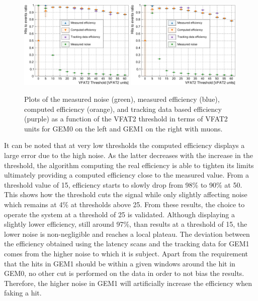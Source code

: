       \begin{figure}[h!]
        \centering
        \includegraphics[width=0.49\textwidth]{img/plots/cEfficiency_Threshold_GEM0-crop}
        \includegraphics[width=0.49\textwidth]{img/plots/cEfficiency_Threshold_GEM1-crop}
        \caption{Plots of the measured noise (green), measured efficiency (blue), computed efficiency (orange), and tracking data based efficiency (purple) as a function of the VFAT2 threshold in terms of VFAT2 units for GEM0 on the left and GEM1 on the right with muons.}
        \label{fig:II-3-data-eff-threshold}
      \end{figure}

      It can be noted that at very low thresholds the computed efficiency displays a large error due to the high noise. As the latter decreases with the increase in the threshold, the algorithm computing the real efficiency is able to tighten its limits ultimately providing a computed efficiency close to the measured value. From a threshold value of 15, efficiency starts to slowly drop from 98\% to 90\% at 50. This shows how the threshold cuts the signal while only slightly affecting noise which remains at 4\% at thresholds above 25. From these results, the choice to operate the system at a threshold of 25 is validated. Although displaying a slightly lower efficiency, still around 97\%, than results at a threshold of 15, the lower noise is non-negligible and reaches a local plateau. The deviation between the efficiency obtained using the latency scans and the tracking data for GEM1 comes from the higher noise to which it is subject. Apart from the requirement that the hits in GEM1 should be within a given windows around the hit in GEM0, no other cut is performed on the data in order to not bias the results. Therefore, the higher noise in GEM1 will artificially increase the efficiency when faking a hit.

